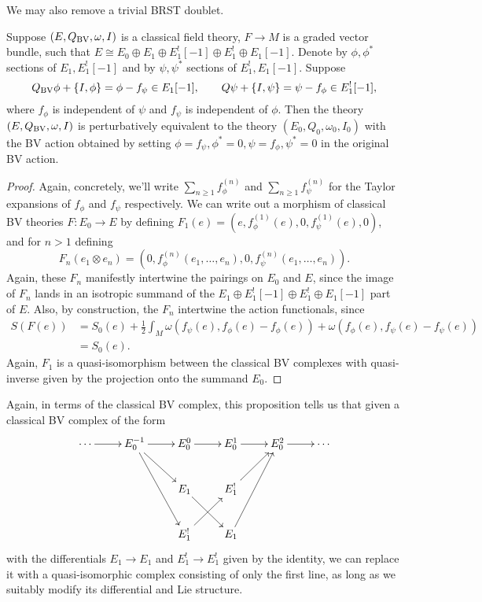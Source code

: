 \documentclass[10pt, oneside]{article}
\begin{document}
We may also remove a trivial BRST doublet.

\begin{prop}
Suppose $(E, Q_{\mathrm{BV}}, \omega, I)$ is a classical field theory, $F\rightarrow M$ is a graded vector bundle, such that $E\cong E_0\oplus E_1\oplus E_1^![-1]\oplus E_1^!\oplus E_1[-1]$. Denote by $\phi, \phi^*$ sections of $E_1,E_1^![-1]$ and by $\psi, \psi^*$ sections of $E_1^!, E_1[-1]$. Suppose
\[Q_{\mathrm{BV}}\phi + \{I, \phi\} = \phi - f_\psi \in E_1[-1] ,\qquad Q\psi + \{I, \psi\} = \psi - f_{\phi} \in E_1^![-1],\]
where $f_\phi$ is independent of $\psi$ and $f_{\psi}$ is independent of $\phi$. Then the theory $(E, Q_{\mathrm{BV}}, \omega, I)$ is perturbatively equivalent to the theory $(E_0, Q_0, \omega_0, I_0)$ with the BV action obtained by setting $\phi = f_\psi, \phi^* = 0,  \psi = f_\phi, \psi^* = 0$ in the original BV action.
\label{prop:BRSTdoublet}
\end{prop}

\begin{proof}
Again, concretely, we'll write $\sum_{n \ge 1} f^{(n)}_\phi$ and $\sum_{n \ge 1} f^{(n)}_{\psi}$ for the Taylor expansions of $f_\phi$ and $f_{\psi}$ respectively.  We can write out a morphism of classical BV theories $F \colon E_0 \to E$ by defining $F_1(e) = (e, f^{(1)}_{\phi}(e),0,f^{(1)}_\psi(e),0)$, and for $n > 1$ defining 
\[F_n(e_1\otimes e_n) = (0, f^{(n)}_{\phi}(e_1, \ldots, e_n), 0, f^{(n)}_{\psi}(e_1, \ldots, e_n)).\]
Again, these $F_n$ manifestly intertwine the pairings on $E_0$ and $E$, since the image of $F_n$ lands in an isotropic summand of the $E_1\oplus E_1^![-1]\oplus E_1^!\oplus E_1[-1]$ part of $E$.  Also, by construction, the $F_n$ intertwine the action functionals, since
\begin{align*}
S(F(e)) &= S_0(e) + \frac{1}{2} \int_M \omega(f_\psi(e), f_\phi(e) - f_\phi(e)) + \omega(f_\phi(e), f_\psi(e) - f_\psi(e)) \\
&= S_0(e).
\end{align*}
Again, $F_1$ is a quasi-isomorphism between the classical BV complexes with quasi-inverse given by the projection onto the summand $E_0$.
\end{proof}

\begin{remark}
Again, in terms of the classical BV complex, this proposition tells us that given a classical BV complex of the form
\[\xymatrix{
\cdots \ar[r] & E_0^{-1}\ar[r] \ar[dr] \ar[ddr] &E_0^0 \ar[r]  &E_0^1 \ar[r] &E_0^2 \ar[r] &\cdots \\
&&E_1 \ar^{~}[dr] &E_1^! \ar[ur] && \\
&&E_1^! \ar^{~}[ur] &E_1 \ar[uur] && \\
}\]
with the differentials $E_1 \to E_1$ and $E_1^! \to E_1^!$ given by the identity, we can replace it with a quasi-isomorphic complex consisting of only the first line, as long as we suitably modify its differential and Lie structure.
\end{remark}
\end{document}
